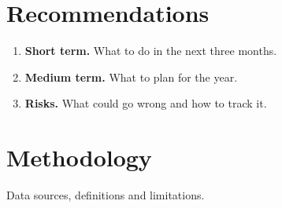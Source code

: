 \documentclass[11pt,a4paper]{report}
\begin{document}
\chapter{Recommendations}
\begin{enumerate}
  \item \textbf{Short term.} What to do in the next three months.
  \item \textbf{Medium term.} What to plan for the year.
  \item \textbf{Risks.} What could go wrong and how to track it.
\end{enumerate}

\appendix
\chapter{Methodology}
Data sources, definitions and limitations.
\end{document}
